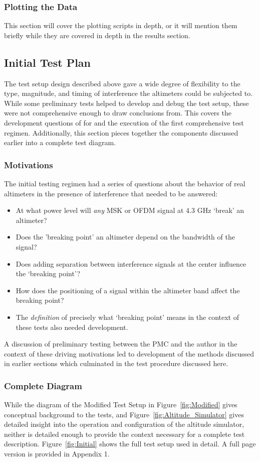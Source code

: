 \subsubsection{Plotting the Data}
This section will cover the plotting scripts in depth, or it will mention them briefly while they are covered in depth in the results section. 
\subsection{Initial Test Plan}
The test setup design described above gave a wide degree of flexibility to the type, magnitude, and timing of interference the altimeters could be subjected to. While some preliminary tests helped to develop and debug the test setup, these were not comprehensive enough to draw conclusions from. This covers the development questions of for and the execution of the first  comprehensive test regimen. Additionally, this section pieces together the components discussed earlier into a complete test diagram. 

\subsubsection{Motivations}
The initial testing regimen had a series of questions about the behavior of real altimeters in the presence of interference that needed to be answered: 

\begin{itemize}
\item At what power level will \textit{any} MSK or OFDM signal at 4.3 GHz `break' an altimeter?
\item Does the 'breaking point' an altimeter depend on the bandwidth of the signal?
\item Does adding separation between interference signals at the center influence the `breaking point'? 
\item How does the positioning of a signal within the altimeter band affect the breaking point?
\item The \textit{definition} of precisely what `breaking point' means in the context of these tests also needed development.  
\end{itemize}

A discussion of preliminary testing between the PMC and the author in the context of these driving motivations led to development of the methods discussed in earlier sections which culminated in the test procedure discussed here.  

\subsubsection{Complete Diagram}
While the diagram of the Modified Test Setup in Figure~\ref{fig:Modified} gives conceptual background to the tests, and Figure~\ref{fig:Altitude_Simulator} gives detailed insight into the operation and configuration of the altitude simulator, neither is detailed enough to provide the context necessary for a complete test description. Figure~\ref{fig:Initial} shows the full test setup used in detail. A full page version is provided in Appendix 1. 




